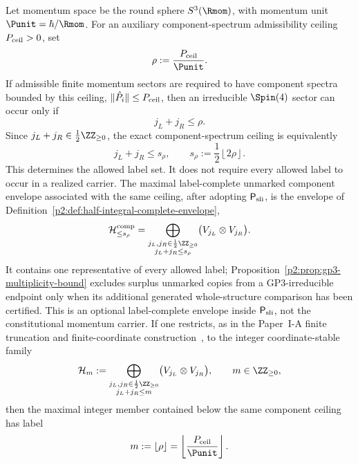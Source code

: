 \documentclass[11pt,a4paper]{article}
\begin{document}
\begin{theorem}
\label{p2:thm:truncation}
Let momentum space be the round sphere $S^3(\Rmom)$, with momentum unit
$\Punit=\hbar/\Rmom$.  For an auxiliary component-spectrum admissibility
ceiling \(P_{\rm ceil}>0\), set
\[
\rho:=\frac{P_{\rm ceil}}{\Punit}.
\]
If admissible finite momentum sectors are required to have component spectra
bounded by this ceiling, $\|\hat P_i\|\le P_{\rm ceil}$, then an irreducible
$\Spin(4)$ sector can occur only if
\begin{equation}
j_L+j_R\le \rho.
\end{equation}
Since $j_L+j_R\in\frac12\ZZ_{\ge0}$, the exact component-spectrum ceiling is equivalently
\begin{equation}
j_L+j_R\le s_\rho,
\qquad
s_\rho:=\frac12\left\lfloor 2\rho\right\rfloor.
\end{equation}
This determines the allowed label set.  It does not require every allowed
label to occur in a realized carrier.  The maximal label-complete unmarked
component envelope associated with the same ceiling, after adopting
\(\mathsf P_{\rm sli}\), is the envelope of
Definition~\ref{p2:def:half-integral-complete-envelope},
\begin{equation}
\mathcal H_{\le s_\rho}^{\mathrm{comp}}
=\bigoplus_{\substack{j_L,j_R\in\frac12\ZZ_{\ge0}\\ j_L+j_R\le s_\rho}}\bigl(V_{j_L}\otimes V_{j_R}\bigr).
\end{equation}
It contains one representative of every allowed label;
Proposition~\ref{p2:prop:gp3-multiplicity-bound} excludes surplus
unmarked copies from a GP3-irreducible endpoint only when its additional
generated whole-structure comparison has been certified.  This is an
optional label-complete envelope inside \(\mathsf P_{\rm sli}\), not the
constitutional momentum carrier.
If one restricts, as in the Paper~I-A finite truncation and finite-coordinate construction~\cite{Kugelmann2026a}, to the integer coordinate-stable family
\begin{equation}
\mathcal H_m:=\bigoplus_{\substack{j_L,j_R\in\frac12\ZZ_{\ge0}\\ j_L+j_R\le m}}\bigl(V_{j_L}\otimes V_{j_R}\bigr),
\qquad m\in\ZZ_{\ge0},
\end{equation}
then the maximal integer member contained below the same component ceiling has label
\begin{equation}
m:=\left\lfloor \rho\right\rfloor
=\left\lfloor \frac{P_{\rm ceil}}{\Punit}\right\rfloor.

\end{equation}
\end{theorem}
\end{document}

